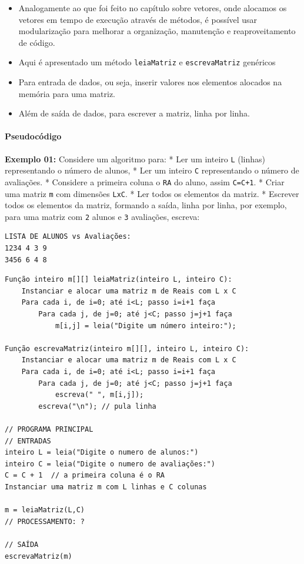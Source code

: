 \documentclass[12pt,a4paper]{article}
\begin{document}
    \begin{itemize}
\item
  Analogamente ao que foi feito no capítulo sobre vetores, onde alocamos
  os vetores em tempo de execução através de métodos, é possível usar
  modularização para melhorar a organização, manutenção e
  reaproveitamento de código.
\item
  Aqui é apresentado um método \texttt{leiaMatriz} e
  \texttt{escrevaMatriz} genéricos
\item
  Para entrada de dados, ou seja, inserir valores nos elementos alocados
  na memória para uma matriz.
\item
  Além de saída de dados, para escrever a matriz, linha por linha.
\end{itemize}

    \hypertarget{pseudocuxf3digo}{%
\paragraph{Pseudocódigo}\label{pseudocuxf3digo}}

    \textbf{Exemplo 01:} Considere um algoritmo para: * Ler um inteiro
\texttt{L} (linhas) representando o número de alunos, * Ler um inteiro
\texttt{C} representando o número de avaliações. * Considere a primeira
coluna o \texttt{RA} do aluno, assim \texttt{C=C+1}. * Criar uma matriz
\texttt{m} com dimensões \texttt{LxC}. * Ler todos os elementos da
matriz. * Escrever todos os elementos da matriz, formando a saída, linha
por linha, por exemplo, para uma matriz com \texttt{2} alunos e
\texttt{3} avaliações, escreva:

\begin{verbatim}
LISTA DE ALUNOS vs Avaliações:
1234 4 3 9
3456 6 4 8
\end{verbatim}

    \begin{verbatim}
Função inteiro m[][] leiaMatriz(inteiro L, inteiro C):
    Instanciar e alocar uma matriz m de Reais com L x C
    Para cada i, de i=0; até i<L; passo i=i+1 faça
        Para cada j, de j=0; até j<C; passo j=j+1 faça
            m[i,j] = leia("Digite um número inteiro:");

Função escrevaMatriz(inteiro m[][], inteiro L, inteiro C):
    Instanciar e alocar uma matriz m de Reais com L x C
    Para cada i, de i=0; até i<L; passo i=i+1 faça
        Para cada j, de j=0; até j<C; passo j=j+1 faça
            escreva(" ", m[i,j]);
        escreva("\n"); // pula linha

// PROGRAMA PRINCIPAL
// ENTRADAS
inteiro L = leia("Digite o numero de alunos:")
inteiro C = leia("Digite o numero de avaliações:")
C = C + 1  // a primeira coluna é o RA
Instanciar uma matriz m com L linhas e C colunas

m = leiaMatriz(L,C)
// PROCESSAMENTO: ?

// SAÍDA
escrevaMatriz(m)
\end{verbatim}
\end{document}
